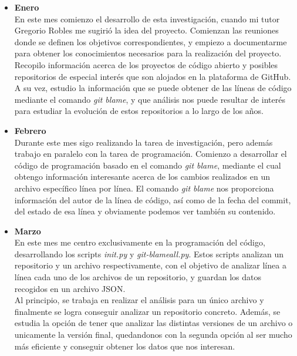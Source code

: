 \documentclass[a4paper, 12pt]{book}
\begin{document}
\begin{itemize}

  \item \textbf{Enero}
  \\En este mes comienzo el desarrollo de esta investigación, cuando mi tutor Gregorio Robles me sugirió la idea del proyecto.
  Comienzan las reuniones donde se definen los objetivos correspondientes, y empiezo a documentarme para obtener los conocimientos
  necesarios para la realización del proyecto.
  \\Recopilo información acerca de los proyectos de código abierto y posibles repositorios de especial interés que son alojados en la plataforma de GitHub.
  A su vez, estudio la información que se puede obtener de las líneas de código mediante el comando \textit{git blame}, y que análisis nos puede
  resultar de interés para estudiar la evolución de estos repositorios a lo largo de los años.

  \item \textbf{Febrero}
  \\Durante este mes sigo realizando la tarea de investigación, pero además trabajo en paralelo con la tarea de programación. Comienzo a 
  desarrollar el código de programación basado en el comando \textit{git blame}, mediante el cual obtengo información interesante acerca de
  los cambios realizados en un archivo específico línea por línea. El comando \textit{git blame} nos proporciona información del autor de la línea de código, así como de la fecha del commit, del estado de
  esa línea y obviamente podemos ver también su contenido.
  
  \item \textbf{Marzo}
  \\En este mes me centro exclusivamente en la programación del código, desarrollando los scripts \textit{init.py} y \textit{git-blameall.py}. Estos scripts
  analizan un repositorio y un archivo respectivamente, con el objetivo de analizar línea a línea cada uno de los archivos de un repositorio, y guardan los datos recogidos en un archivo JSON.
  \\Al principio, se trabaja en realizar el análisis para un único archivo y finalmente se logra conseguir analizar un repositorio concreto. Además, se estudia
  la opción de tener que analizar las distintas versiones de un archivo o unicamente la versión final, quedandonos con la segunda opción al ser mucho más eficiente y 
  conseguir obtener los datos que nos interesan.
  

\end{itemize}
\end{document}
